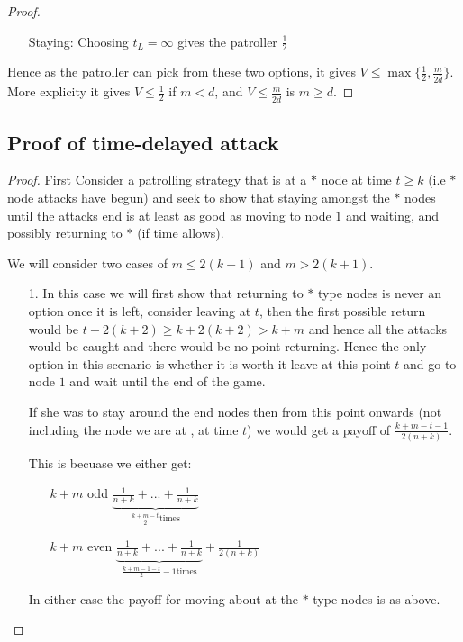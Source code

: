 \documentclass[a4paper,10pt]{article}
\theoremstyle{definition}
\theoremstyle{definition}
\theoremstyle{remark}
\theoremstyle{definition}
\begin{document}
\begin{proof}
\begin{itemize}
\item[Staying:]Choosing $t_{L}=\infty$ gives the patroller $\frac{1}{2}$
\end{itemize}

Hence as the patroller can pick from these two options, it gives $V \leq \max\{\frac{1}{2} , \frac{m}{2\bar{d}} \}$. More explicity it gives $V \leq \frac{1}{2}$ if $m < \bar{d}$, and $V \leq \frac{m}{2\bar{d}}$ is $m \geq \bar{d}$.
\end{proof}

\subsection{Proof of time-delayed attack}
\label{Appendix:Proof of time-delayed attack}

\begin{proof}
First Consider a patrolling strategy that is at a $*$ node at time $t \geq k$ (i.e $*$ node attacks have begun) and seek to show that staying amongst the $*$ nodes until the attacks end is at least as good as moving to node $1$ and waiting, and possibly returning to $*$ (if time allows).

We will consider two cases of $m \leq 2(k+1)$ and $m > 2(k+1)$.
\begin{itemize}
\item[1.] In this case we will first show that returning to $*$ type nodes is never an option once it is left, consider leaving at $t$, then the first possible return would be $t+2(k+2) \geq k + 2(k+2) > k+m$ and hence all the attacks would be caught and there would be no point returning. Hence the only option in this scenario is whether it is worth it leave at this point $t$ and go to node $1$ and wait until the end of the game.

If she was to stay around the end nodes then from this point onwards (not including the node we are at , at time $t$) we would get a payoff of $\frac{k+m-t-1}{2(n+k)}$.

This is becuase we either get:
\begin{itemize}
\item[$k+m$ odd] $\underbrace{\frac{1}{n+k}+...+\frac{1}{n+k}}_{\frac{k+m-t}{2} \text{times}}$
\item[$k+m$ even] $\underbrace{\frac{1}{n+k}+...+\frac{1}{n+k}}_{\frac{k+m-1-t}{2}-1 \text{times}} +\frac{1}{2(n+k)}$
\end{itemize}

In either case the payoff for moving about at the $*$ type nodes is as above.


\end{itemize}
\end{proof}
\end{document}
